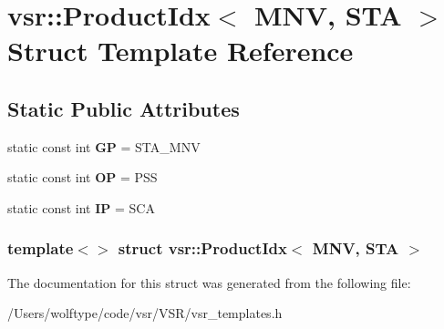 \hypertarget{structvsr_1_1_product_idx_3_01_m_n_v_00_01_s_t_a_01_4}{\section{vsr\-:\-:Product\-Idx$<$ M\-N\-V, S\-T\-A $>$ Struct Template Reference}
\label{structvsr_1_1_product_idx_3_01_m_n_v_00_01_s_t_a_01_4}
}
\subsection*{Static Public Attributes}
\begin{DoxyCompactItemize}
\item 
\hypertarget{structvsr_1_1_product_idx_3_01_m_n_v_00_01_s_t_a_01_4_a5ed00d514dfe9fb87155aec2d00f7613}{static const int {\bfseries G\-P} = S\-T\-A\-\_\-\-M\-N\-V}\label{structvsr_1_1_product_idx_3_01_m_n_v_00_01_s_t_a_01_4_a5ed00d514dfe9fb87155aec2d00f7613}

\item 
\hypertarget{structvsr_1_1_product_idx_3_01_m_n_v_00_01_s_t_a_01_4_a79916feb419e2f0f8786f85a5b445120}{static const int {\bfseries O\-P} = P\-S\-S}\label{structvsr_1_1_product_idx_3_01_m_n_v_00_01_s_t_a_01_4_a79916feb419e2f0f8786f85a5b445120}

\item 
\hypertarget{structvsr_1_1_product_idx_3_01_m_n_v_00_01_s_t_a_01_4_a8dede5e7abac3886add9f5d641874796}{static const int {\bfseries I\-P} = S\-C\-A}\label{structvsr_1_1_product_idx_3_01_m_n_v_00_01_s_t_a_01_4_a8dede5e7abac3886add9f5d641874796}

\end{DoxyCompactItemize}
\subsubsection*{template$<$$>$ struct vsr\-::\-Product\-Idx$<$ M\-N\-V, S\-T\-A $>$}



The documentation for this struct was generated from the following file\-:\begin{DoxyCompactItemize}
\item 
/\-Users/wolftype/code/vsr/\-V\-S\-R/vsr\-\_\-templates.\-h\end{DoxyCompactItemize}
